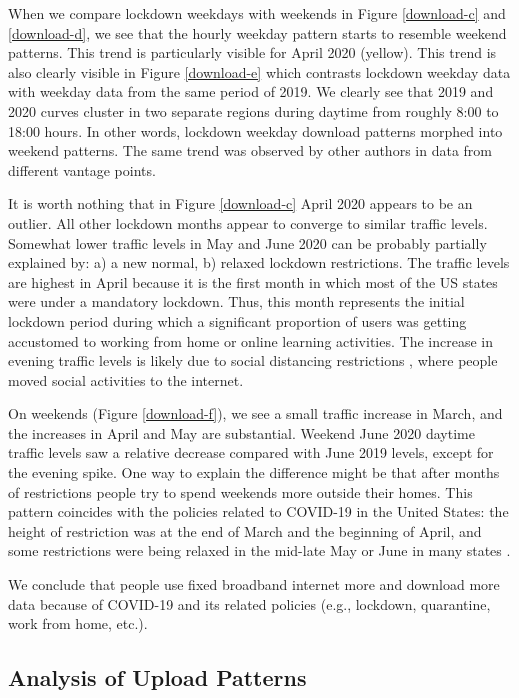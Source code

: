 When we compare lockdown weekdays with weekends in Figure \ref{download-c} and \ref{download-d}, we see that the hourly weekday pattern starts to resemble weekend patterns. This trend is particularly visible for April 2020 (yellow). This trend is also clearly visible in Figure \ref{download-e} which contrasts lockdown weekday data with weekday data from the same period of 2019. We clearly see that 2019 and 2020 curves cluster in two separate regions during daytime from roughly 8:00 to 18:00 hours. In other words, lockdown weekday download patterns morphed into weekend patterns. The same trend was observed by other authors in data from different vantage points.%

It is worth nothing that in Figure \ref{download-c} April 2020 appears to be an outlier. All other lockdown months appear to converge to similar traffic levels. Somewhat lower traffic levels in May and June 2020 can be probably partially explained by: a) a new normal, b) relaxed lockdown restrictions. The traffic levels are highest in April because it is the first month in which most of the US states were under a mandatory lockdown. Thus, this month represents the initial lockdown period during which a significant proportion of users was getting accustomed to working from home or online learning activities. The increase in evening traffic levels is likely due to social distancing restrictions \cite{lockdownsguide}, where people moved social activities to the internet.

On weekends (Figure \ref{download-f}), we see a small traffic increase in March, and the increases in April and May are substantial. Weekend June 2020 daytime traffic levels saw a relative decrease compared with June 2019 levels, except for the evening spike. One way to explain the difference might be that after months of restrictions people try to spend weekends more outside their homes. This pattern coincides with the policies related to COVID-19 in the United States: the height of restriction was at the end of March and the beginning of April, and some restrictions were being relaxed in the mid-late May or June in many states \cite{covid19restriction}.

We conclude that people use fixed broadband internet more and download more data because of COVID-19 and its related policies (e.g., lockdown, quarantine, work from home, etc.).

\subsection{Analysis of Upload Patterns}
\label{sec:analysis-of-upload-patterns}

